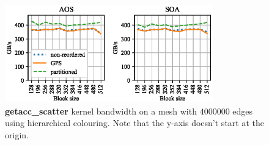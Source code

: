 
\begin{figure}[Htbp]
  \centering
  \includegraphics[width=9cm]{fig/bookleaf_bw-vs-bs_hier.eps}
  \caption{\textbf{getacc\_scatter} kernel bandwidth on a mesh with $4000000$
  edges using hierarchical colouring. Note that the y-axis doesn't start at the
  origin.}
  \label{fig:bookleaf_bw-vs-bs_hier}
\end{figure}

